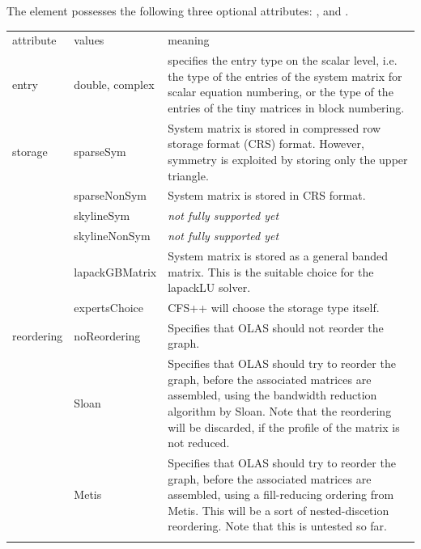 %
%
The  element possesses the following three optional attributes:
,  and .
%
%
\begin{center}
\begin{longtable}{llp{}}
\hline\noalign{\smallskip}
attribute & values & meaning \\
\noalign{\smallskip}\hline\noalign{\smallskip}
entry & double, complex & specifies the entry type on the scalar level, i.e.
                          the type of the entries of the system matrix for
                          scalar equation numbering, or the type of the entries
                          of the tiny matrices in block numbering.\\
\noalign{\smallskip}\hline\noalign{\smallskip}
storage & sparseSym      & System matrix is stored in compressed row storage
                           format (CRS) format. However, symmetry is exploited
                           by storing only the upper triangle.\\
        & sparseNonSym	 & System matrix is stored in CRS format.\\
        & skylineSym	 & \emph{not fully supported yet}\\
        & skylineNonSym	 & \emph{not fully supported yet}\\
        & lapackGBMatrix & System matrix is stored as a general banded matrix.
                           This is the suitable choice for the lapackLU solver.
                           \\
        & expertsChoice  & CFS++ will choose the storage type itself.\\
\noalign{\smallskip}\hline\noalign{\smallskip}
reordering & noReordering  & Specifies that OLAS should not reorder the
                             graph.\\
           & Sloan         & Specifies that OLAS should try to reorder the
                             graph, before the associated matrices are
                             assembled, using the bandwidth reduction algorithm
                             by Sloan. Note that the reordering will be
                             discarded, if the profile of the matrix is not
                             reduced.\\
           & Metis         & Specifies that OLAS should try to reorder the
                             graph, before the associated matrices are
                             assembled, using a fill-reducing ordering from
                             Metis. This will be a sort of nested-discetion
                             reordering. Note that this is untested so far.\\
\noalign{\smallskip}\hline
\end{longtable}
\end{center}
